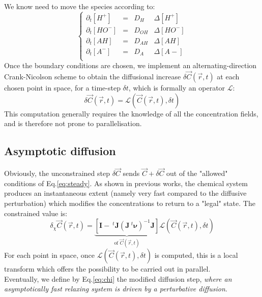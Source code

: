 \documentclass[aps,11pt]{revtex4}
\begin{document}
We know need to move the species according to:
\begin{equation}
\label{eq:move}
\left\lbrace
\begin{array}{lcll}
\partial_t [H^+]  & = & D_{H}  &\Delta [H^+]\\
\partial_t [HO^-] & = & D_{OH} &\Delta [HO^-]\\
\partial_t [AH]   & = & D_{AH} &\Delta [AH]\\
\partial_t [A^-]  & = & D_{A}  &\Delta [A-]\\
\end{array}
\right.
\end{equation}
Once the boundary conditions are chosen, we implement an alternating-direction Crank-Nicolson scheme to obtain
the diffusional increase $\delta \vec{C}(\vec{r},t)$ at each chosen point in space, for a time-step $\delta t$, which is formally an operator $\mathcal{L}$:
\begin{equation}
	\delta \vec{C}(\vec{r},t) = \mathcal{L}(\vec{C}(\vec{r},t),\delta t)
\end{equation}
This computation generally requires the knowledge of all the concentration fields, and is therefore not prone to parallelisation. 
     
\subsection{Asymptotic diffusion}
Obviously, the unconstrained step $\delta \vec{C}$ sends $\vec{C} + \delta\vec{C}$ out of the "allowed" conditions of Eq.\eqref{eq:steady}.
As shown in previous works, the chemical system produces an instantaneous extent (namely very fast compared to the diffusive perturbation) which
modifies the concentrations to return to a "legal" state. The constrained value is:
\begin{equation}
\label{eq:chi}
	\delta_\chi \vec{C}(\vec{r},t) = \underbrace{\left[\bm{I} - ~^t\bm{J}\left(\bm{J}~^t\bm{\nu}\right)^{-1} \bm{J}\right]}_{\text{of } \vec{C}(\vec{r},t)} 
	\mathcal{L}(\vec{C}(\vec{r},t),\delta t)
\end{equation}
For each point in space, once $\mathcal{L}(\vec{C}(\vec{r},t),\delta t)$ is computed, this is a local transform which offers the possibility to be carried out in parallel.\\
Eventually, we define by Eq.\eqref{eq:chi} the modified diffusion step, \textit{where an asymptotically fast relaxing system is driven by a perturbative diffusion}.
\end{document}
